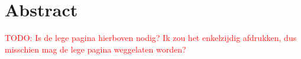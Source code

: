 \section*{Abstract}\enlargethispage{1.5\baselineskip}

\textcolor{red}{TODO: Is de lege pagina hierboven nodig? Ik zou het enkelzijdig afdrukken, dus misschien mag de lege pagina weggelaten worden?}
